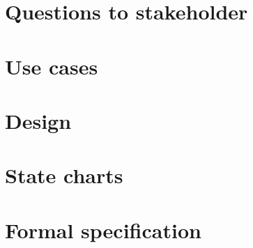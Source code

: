 \documentclass[a4paper,11pt]{article}
\begin{document}
	
	
	\tableofcontents
	\newpage
	
	\section{Questions to stakeholder}
	
	\newpage
	
	\section{Use cases}
	
	\newpage

	\section{Design}
	
	\newpage

	\section{State charts}
	
	\newpage

	\section{Formal specification}
	
	\newpage
\end{document}
